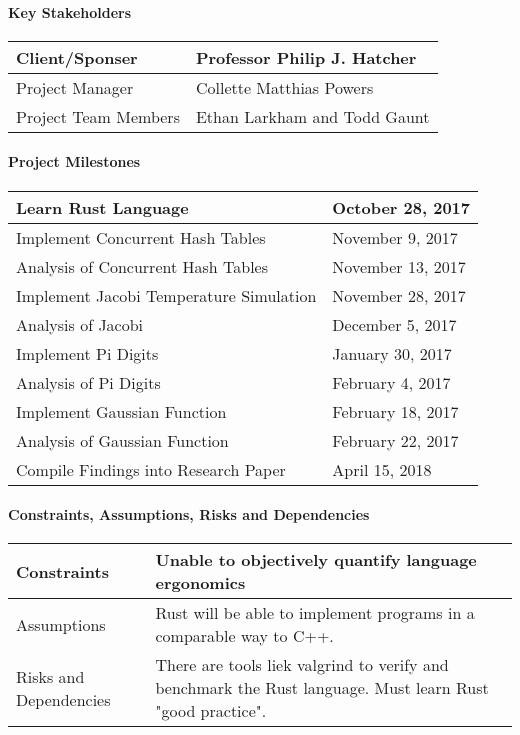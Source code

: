 \documentclass[10pt,a4paper]{report}
\begin{document}
\paragraph{Key Stakeholders}
\begin{flushleft}
	\begin{tabulary}{\textwidth}{ | L | L | }
		\hline
		Client/Sponser & Professor Philip J. Hatcher \\
		\hline
		Project Manager & Collette Matthias Powers \\
		\hline
		Project Team Members & Ethan Larkham and Todd Gaunt \\
		\hline
	\end{tabulary}
\end{flushleft}
\paragraph{Project Milestones}
\begin{flushleft}
	\begin{tabulary}{\textwidth}{ | L | L | }
		\hline
		Learn Rust Language & October 28, 2017 \\
		\hline
		Implement Concurrent Hash Tables & November 9, 2017 \\
		Analysis of Concurrent Hash Tables & November 13, 2017 \\
		\hline
		Implement Jacobi Temperature Simulation & November 28, 2017 \\
		Analysis of Jacobi & December 5, 2017 \\
		\hline
		Implement Pi Digits & January 30, 2017 \\
		Analysis of Pi Digits & February 4, 2017 \\
		\hline
		Implement Gaussian Function & February 18, 2017 \\
		Analysis of Gaussian Function & February 22, 2017 \\
		\hline
		Compile Findings into Research Paper & April 15, 2018 \\
		\hline
	\end{tabulary}
\end{flushleft}
\paragraph{Constraints, Assumptions, Risks and Dependencies}
\begin{flushleft}
	\begin{tabulary}{\textwidth}{ | L | L | }
		\hline
		Constraints & Unable to objectively quantify language
		ergonomics \\
		\hline
		Assumptions & Rust will be able to implement programs in a
		comparable way to C++. \\
		\hline
		Risks and Dependencies & There are tools liek valgrind to
		verify and benchmark the Rust language. Must learn Rust "good
		practice". \\
		\hline
	\end{tabulary}
\end{flushleft}
\end{document}
